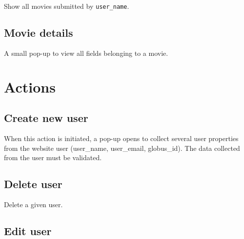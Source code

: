 Show all movies submitted by \texttt{user\_name}.

\subsection{Movie details}

A small pop-up to view all fields belonging to a movie.

\section{Actions}

\subsection{Create new user}

When this action is initiated, a pop-up opens to collect several user 
properties from the website user (user\_name, user\_email, globus\_id). 
The data collected from the user must be validated. 

\subsection{Delete user}

Delete a given user.

\subsection{Edit user}

